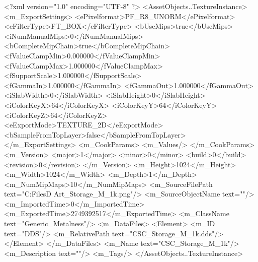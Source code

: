 <?xml version="1.0" encoding="UTF-8" ?>
<AssetObjects..TextureInstance>
	<m_ExportSettings>
		<ePixelformat>PF_R8_UNORM</ePixelformat>
		<eFilterType>FT_BOX</eFilterType>
		<bUseMips>true</bUseMips>
		<iNumManualMips>0</iNumManualMips>
		<bCompleteMipChain>true</bCompleteMipChain>
		<fValueClampMin>0.000000</fValueClampMin>
		<fValueClampMax>1.000000</fValueClampMax>
		<fSupportScale>1.000000</fSupportScale>
		<fGammaIn>1.000000</fGammaIn>
		<fGammaOut>1.000000</fGammaOut>
		<iSlabWidth>0</iSlabWidth>
		<iSlabHeight>0</iSlabHeight>
		<iColorKeyX>64</iColorKeyX>
		<iColorKeyY>64</iColorKeyY>
		<iColorKeyZ>64</iColorKeyZ>
		<eExportMode>TEXTURE_2D</eExportMode>
		<bSampleFromTopLayer>false</bSampleFromTopLayer>
	</m_ExportSettings>
	<m_CookParams>
		<m_Values/>
	</m_CookParams>
	<m_Version>
		<major>1</major>
		<minor>0</minor>
		<build>0</build>
		<revision>0</revision>
	</m_Version>
	<m_Height>1024</m_Height>
	<m_Width>1024</m_Width>
	<m_Depth>1</m_Depth>
	<m_NumMipMaps>10</m_NumMipMaps>
	<m_SourceFilePath text="C:\Users\Shadow\Desktop\Working Files\3D Art\Textures\CSC_Storage_M_1k.png"/>
	<m_SourceObjectName text=""/>
	<m_ImportedTime>0</m_ImportedTime>
	<m_ExportedTime>2749392517</m_ExportedTime>
	<m_ClassName text="Generic_Metalness"/>
	<m_DataFiles>
		<Element>
			<m_ID text="DDS"/>
			<m_RelativePath text="CSC_Storage_M_1k.dds"/>
		</Element>
	</m_DataFiles>
	<m_Name text="CSC_Storage_M_1k"/>
	<m_Description text=""/>
	<m_Tags/>
</AssetObjects..TextureInstance>

